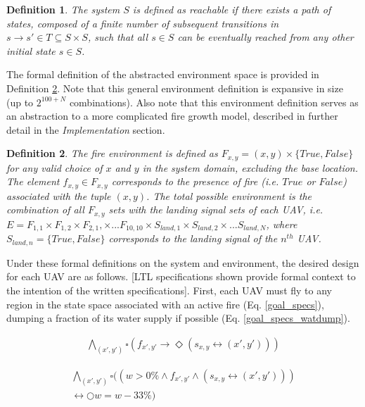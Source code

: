 \documentclass{ieeeaccess}
\newcommand{\always}{\square}
\newcommand{\eventually}{\Diamond}
\newcommand{\next}{\bigcirc}
\newtheorem{definition}{Definition}
\begin{document}
\begin{definition}
	\label{reachable}
	The system $S$ is defined as \textit{reachable} if there exists a path of states, composed of a finite number of subsequent transitions in $s \to s' \in T \subseteq S \times S$, such that all $s \in S$ can be eventually reached from any other initial state $s \in S$.
\end{definition}

The formal definition of the abstracted environment space is provided in Definition \ref{env}. Note that this general environment definition is expansive in size (up to $2^{100+N}$ combinations). Also note that this environment definition serves as an abstraction to a more complicated fire growth model, described in further detail in the \textit{Implementation} section.

\begin{definition}
	\label{env}
	The fire environment is defined as $F_{x,y} = (x, y) \times \{True, False\}$ for any valid choice of $x$ and $y$ in the system domain, excluding the base location. The element $f_{x,y} \in F_{x,y}$ corresponds to the presence of fire (i.e. $True$ or $False$) associated with the tuple $(x,y)$. The total possible environment is the combination of all $F_{x,y}$ sets with the landing signal sets of each UAV, i.e. $E = F_{1,1} \times F_{1,2} \times F_{2,1}, \times ... F_{10,10} \times S_{land,1} \times S_{land,2} \times... S_{land,N}$, where $S_{land, n} = \{True, False\}$ corresponds to the landing signal of the $n^{th}$ UAV.
\end{definition}

Under these formal definitions on the system and environment, the desired design for each UAV are as follows. [LTL specifications shown provide formal context to the intention of the written specifications]. First, each UAV must fly to any region in the state space associated with an active fire (Eq. \ref{goal_specs}), dumping a fraction of its water supply if possible (Eq. \ref{goal_specs_watdump}). 

\begin{equation}
\begin{aligned}
\bigwedge_{(x',y')} \always (f_{x',y'} \longrightarrow \eventually (s_{x,y} \leftrightarrow (x', y')))
\end{aligned}
\label{goal_specs}
\end{equation}

\begin{equation}
\begin{aligned}
\bigwedge_{(x',y')} \always ((w > 0\% \land f_{x',y'} \land (s_{x,y} \leftrightarrow (x', y'))) \\ \leftrightarrow \next w = w - 33 \%)
\end{aligned}
\label{goal_specs_watdump}
\end{equation}
\end{document}
